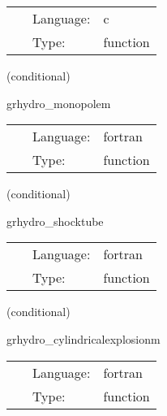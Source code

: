  \begin{tabular*}{160mm}{cll} 
~ & Language:  & c \\ 
~ & Type:  & function \\ 
\end{tabular*} 


\vspace{5mm}

   (conditional) 

\hspace{5mm} grhydro\_monopolem 

\hspace{5mm}{\it monopole initial data } 


\hspace{5mm}

 \begin{tabular*}{160mm}{cll} 
~ & Language:  & fortran \\ 
~ & Type:  & function \\ 
\end{tabular*} 


\vspace{5mm}

   (conditional) 

\hspace{5mm} grhydro\_shocktube 

\hspace{5mm}{\it shocktube initial data } 


\hspace{5mm}

 \begin{tabular*}{160mm}{cll} 
~ & Language:  & fortran \\ 
~ & Type:  & function \\ 
\end{tabular*} 


\vspace{5mm}

   (conditional) 

\hspace{5mm} grhydro\_cylindricalexplosionm 

\hspace{5mm}{\it cylindrical explosion initial data - mhd-only } 


\hspace{5mm}

 \begin{tabular*}{160mm}{cll} 
~ & Language:  & fortran \\ 
~ & Type:  & function \\ 
\end{tabular*} 



